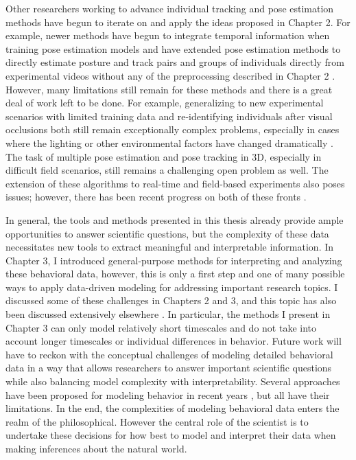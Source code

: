 Other researchers working to advance individual tracking and pose estimation methods have begun to iterate on and apply the ideas proposed in Chapter 2. For example, newer methods have begun to integrate temporal information when training pose estimation models \citep{liu2020optiflex, wu2020deep} and have extended pose estimation methods to directly estimate posture and track pairs and groups of individuals directly from experimental videos without any of the preprocessing described in Chapter 2 \citep{pereira2020sleap}. However, many limitations still remain for these methods and there is a great deal of work left to be done. For example, generalizing to new experimental scenarios with limited training data \citep{mathis2020imagenet} and re-identifying individuals after visual occlusions both still remain exceptionally complex problems, especially in cases where the lighting or other environmental factors have changed dramatically \citep{romero2018idtracker, mathis2020imagenet}. The task of multiple pose estimation and pose tracking in 3D, especially in difficult field scenarios, still remains a challenging open problem as well. The extension of these algorithms to real-time and field-based experiments also poses issues; however, there has been recent progress on both of these fronts \citep{Zuffi:ICCV:2019, kane2020real}.

In general, the tools and methods presented in this thesis already provide ample opportunities to answer scientific questions, but the complexity of these data necessitates new tools to extract meaningful and interpretable information. In Chapter 3, I introduced general-purpose methods for interpreting and analyzing these behavioral data, however, this is only a first step and one of many possible ways to apply data-driven modeling for addressing important research topics. I discussed some of these challenges in Chapters 2 and 3, and this topic has also been discussed extensively elsewhere \citep{brown2018ethology, berman2018measuring, datta2019computational}. In particular, the methods I present in Chapter 3 can only model relatively short timescales and do not take into account longer timescales or individual differences in behavior. Future work will have to reckon with the conceptual challenges of modeling detailed behavioral data in a way that allows researchers to answer important scientific questions while also balancing model complexity with interpretability. Several approaches have been proposed for modeling behavior in recent years \citep{berman2014mapping, berman2016predictability, wiltschko2015mapping, Costa1501, johnson2016composing, markowitz2018striatum}, but all have their limitations. In the end, the complexities of modeling behavioral data enters the realm of the philosophical. However the central role of the scientist is to undertake these decisions for how best to model and interpret their data when making inferences about the natural world.
